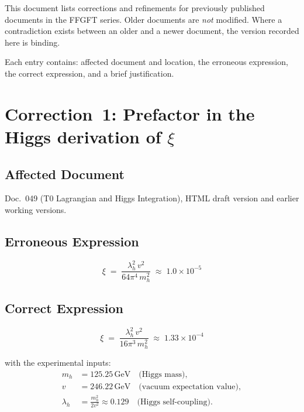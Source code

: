 \bigskip

This document lists corrections and refinements for previously
published documents in the FFGFT series. Older documents are
\emph{not} modified. Where a contradiction exists between an older and
a newer document, the version recorded here is binding.

Each entry contains: affected document and location, the erroneous
expression, the correct expression, and a brief justification.

\section{\texorpdfstring{Correction~1: Prefactor in the Higgs derivation of $\xi$}{Correction 1: Prefactor in the Higgs derivation of xi}}

\subsection*{Affected Document}

Doc.~049 (T0 Lagrangian and Higgs Integration), HTML draft version
and earlier working versions.

\subsection*{Erroneous Expression}

\begin{equation}
  \xi \;=\; \frac{\lambda_h^2\, v^2}{64\pi^4\, m_h^2}
  \;\approx\; 1.0 \times 10^{-5}
  \tag{old -- wrong}
\end{equation}

\subsection*{Correct Expression}

\begin{equation}
  \boxed{
    \xi \;=\; \frac{\lambda_h^2\, v^2}{16\pi^3\, m_h^2}
    \;\approx\; 1.33 \times 10^{-4}
  }
  \tag{190.1}
\end{equation}

with the experimental inputs:
\begin{align*}
  m_h      &= 125.25\,\text{GeV} \quad \text{(Higgs mass)}, \\
  v        &= 246.22\,\text{GeV} \quad \text{(vacuum expectation value)}, \\
  \lambda_h &= \frac{m_h^2}{2v^2} \approx 0.129
               \quad \text{(Higgs self-coupling)}.
\end{align*}

